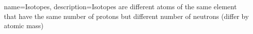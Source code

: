 {
    name=Isotopes,
    description={Isotopes are different atoms of the same element that have the same number of protons but different number of neutrons (differ by atomic mass)}
}
 
